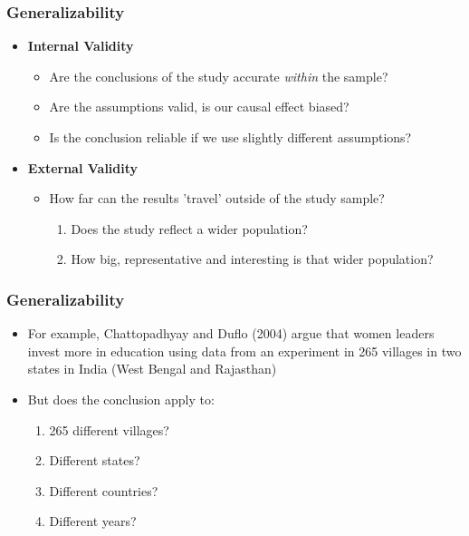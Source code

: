 \documentclass[xcolor=x11names,compress]{beamer}\usepackage[]{graphicx}\usepackage[]{xcolor}
\renewcommand{\(}{\begin{columns}}
\renewcommand{\)}{\end{columns}}
\newcommand{\<}[1]{\begin{column}{#1}}
\renewcommand{\>}{\end{column}}
\begin{document}
\begin{frame}
\frametitle{Generalizability}
\begin{itemize}
\item \textbf{Internal Validity}
\begin{itemize}
\item Are the conclusions of the study accurate \textit{within} the sample?
\pause
\item Are the assumptions valid, is our causal effect biased?
\pause
\item Is the conclusion reliable if we use slightly different assumptions?
\pause
\end{itemize}
\item \textbf{External Validity}
\begin{itemize}
\item How far can the results 'travel' outside of the study sample?
\pause
\begin{enumerate}
\item Does the study reflect a wider population?
\pause
\item How big, representative and interesting is that wider population?
\end{enumerate}
\end{itemize}
\end{itemize}
\end{frame}

\begin{frame}
\frametitle{Generalizability}
\begin{itemize}
\item For example, Chattopadhyay and Duflo (2004) argue that women leaders invest more in education using data from an experiment in 265 villages in two states in India (West Bengal and Rajasthan)
\pause
\item But does the conclusion apply to:
\pause
\begin{enumerate}
\item 265 different villages?
\pause
\item Different states?
\pause
\item Different countries?
\pause
\item Different years?
\end{enumerate}
\end{itemize}
\end{frame}
\end{document}
